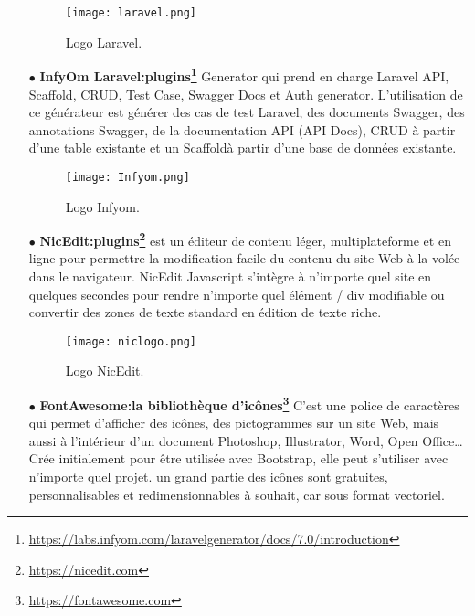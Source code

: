 \begin{itemize}
\cite{wiki:Laravel}
\begin{figure}[ht]
	\centering
	\texttt{[image: laravel.png]}
	\caption{Logo Laravel.}
	\label{fig:Laravel }
\end{figure}
\FloatBarrier

\medskip

	\item[$\bullet$] \textbf{ InfyOm Laravel:plugins\footnote{ \url{https://labs.infyom.com/laravelgenerator/docs/7.0/introduction} }} 
 Generator qui prend 
en charge Laravel API, Scaffold, CRUD,
Test Case, Swagger Docs et Auth generator.
L'utilisation de ce générateur est  générer des cas de test Laravel, 
des documents Swagger, des annotations Swagger, de la documentation API (API Docs), CRUD à partir d'une table existante et un Scaffoldà partir d'une base de données existante.
\cite{wiki:Laravel}
\begin{figure}[ht]
	\centering
	\texttt{[image: Infyom.png]}
	\caption{Logo Infyom.}
	\label{fig:Infyom }
\end{figure}
\FloatBarrier
\medskip


\item[$\bullet$] \textbf{ NicEdit:plugins\footnote{ \url{https://nicedit.com} }} 
 est un éditeur de contenu léger, multiplateforme et en ligne pour permettre la modification facile du contenu du site Web à la volée dans le navigateur. NicEdit Javascript s'intègre à n'importe quel site en quelques secondes pour rendre n'importe quel élément / div modifiable ou convertir des zones de texte standard en édition de texte riche.

\begin{figure}[ht]
	\centering
	\texttt{[image: niclogo.png]}
	\caption{Logo NicEdit.}
	\label{fig:NicEdit }
\end{figure}
\FloatBarrier
\medskip


\item[$\bullet$] \textbf{ FontAwesome:la bibliothèque d’icônes\footnote{ \url{https://fontawesome.com} }} 
C’est une police de caractères qui permet d’afficher des icônes, des pictogrammes sur un site Web, mais aussi à l’intérieur d’un document Photoshop, Illustrator, Word, Open Office… Crée initialement pour être utilisée avec Bootstrap, elle peut s’utiliser avec n’importe quel projet. un grand partie des  icônes sont gratuites, personnalisables et redimensionnables à souhait, car sous format vectoriel.


\end{itemize}
